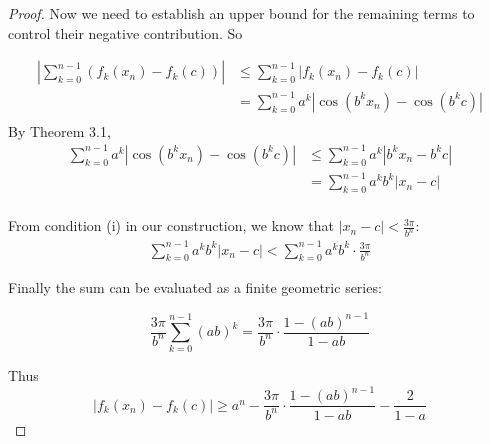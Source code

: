 \documentclass[fontsize=14pt]{scrartcl}
\begin{document}
\begin{proof}
    \newpage 
    
    Now we need to establish an upper bound for the remaining terms to control their negative contribution. So
    
    \begin{equation*}
        \begin{aligned}
        \left|\sum_{k=0}^{n-1}(f_k(x_n)-f_k(c))\right| &\leq \sum_{k=0}^{n-1}|f_k(x_n)-f_k(c)| \\
        &= \sum_{k=0}^{n-1}a^k|\cos(b^k x_n) - \cos(b^k c)| \\
    \end{aligned} 
    \end{equation*}
    By Theorem 3.1,
    \begin{equation*}
        \begin{aligned}
            \sum_{k=0}^{n-1}a^k|\cos(b^k x_n) - \cos(b^k c)| &\leq \sum_{k=0}^{n-1}a^k|b^k x_n - b^k c| \\
             &= \sum_{k=0}^{n-1}a^kb^k|x_n - c| \\
        \end{aligned}
    \end{equation*}

    From condition (i) in our construction, we know that $|x_n-c| < \frac{3\pi}{b^n}$:
    \begin{equation*}
        \begin{aligned}
             \sum_{k=0}^{n-1}a^kb^k|x_n - c| < \sum_{k=0}^{n-1}a^kb^k \cdot \frac{3\pi}{b^n}
        \end{aligned}
    \end{equation*}

    Finally the sum can be evaluated as a finite geometric series:

    \begin{equation*}
        \frac{3\pi}{b^n}\sum_{k=0}^{n-1}(ab)^k = \frac{3\pi}{b^n} \cdot \frac{1-(ab)^{n-1}}{1-ab}
    \end{equation*}
    
    Thus
    \begin{equation}
        \left| f_k(x_n)-f_k(c)\right| \geq a^n - \frac{3\pi}{b^n} \cdot \frac{1-(ab)^{n-1}}{1-ab} - \frac{2}{1-a}
    \end{equation}
    \newpage
    

\end{proof}
\end{document}
